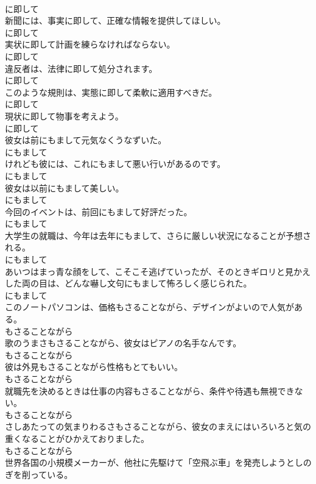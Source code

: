 \documentclass[8pt]{extreport}
\begin{document}
\begin{CJK}{UTF8}{min}
\\	に即して
\\	新聞には、事実に即して、正確な情報を提供してほしい。	
\\	に即して
\\	実状に即して計画を練らなければならない。	
\\	に即して
\\	違反者は、法律に即して処分されます。	
\\	に即して
\\	このような規則は、実態に即して柔軟に適用すべきだ。	
\\	に即して
\\	現状に即して物事を考えよう。	
\\	に即して
\\	彼女は前にもまして元気なくうなずいた。	
\\	にもまして
\\	けれども彼には、これにもまして悪い行いがあるのです。	
\\	にもまして
\\	彼女は以前にもまして美しい。	
\\	にもまして
\\	今回のイベントは、前回にもまして好評だった。	
\\	にもまして
\\	大学生の就職は、今年は去年にもまして、さらに厳しい状況になることが予想される。	
\\	にもまして
\\	あいつはまっ青な顔をして、こそこそ逃げていったが、そのときギロリと見かえした両の目は、どんな嚇し文句にもまして怖ろしく感じられた。	
\\	にもまして
\\	このノートパソコンは、価格もさることながら、デザインがよいので人気がある。	
\\	もさることながら
\\	歌のうまさもさることながら、彼女はピアノの名手なんです。	
\\	もさることながら
\\	彼は外見もさることながら性格もとてもいい。	
\\	もさることながら
\\	就職先を決めるときは仕事の内容もさることながら、条件や待遇も無視できない。	
\\	もさることながら
\\	さしあたっての気まりわるさもさることながら、彼女のまえにはいろいろと気の重くなることがひかえておりました。	
\\	もさることながら
\\	世界各国の小規模メーカーが、他社に先駆けて「空飛ぶ車」を発売しようとしのぎを削っている。	

\end{CJK}
\end{document}
